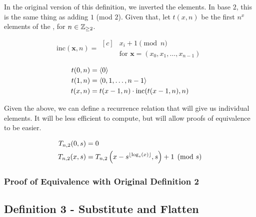 \documentclass[conference]{IEEEtran}
\begin{document}
In the original version of this definition, we inverted the elements. In base $2$, this is the same thing as adding $1$ (mod $2$). Given that, let $t(x, n)$ be the first $n^x$ elements of the \ETMS, for $n \in \mathbb{Z}_{\ge 2}$.

\begin{equation}
    \text{inc}(\mathbf{x}, n) = \begin{aligned}[c]
            &x_i + 1 \pmod{n} \\
            &\text{for } \mathbf{x} = (x_0, x_1, \ldots, x_{n-1})
    \end{aligned}
\end{equation}

\begin{equation}
    \begin{aligned}
t(0, n) &= \langle 0 \rangle \\
t(1, n) &= \langle 0, 1, \ldots, n - 1 \rangle \\
t(x, n) &= t(x - 1, n) \cdot \text{inc}(t(x - 1, n), n)
    \end{aligned}
\end{equation}

Given the above, we can define a recurrence relation that will give us individual elements. It will be less efficient to compute, but will allow proofs of equivalence to be easier.

\begin{equation}
    \begin{aligned}
T_{n,2}(0, s) &= 0 \\
T_{n,2}(x, s) &= T_{n,2}\left(x - s^{\left\lfloor \log_s(x) \right\rfloor}, s\right) + 1 \pmod{s}
    \end{aligned}
\end{equation}

\subsubsection{Proof of Equivalence with Original Definition 2}

\subsection{Definition 3 - Substitute and Flatten}

\end{document}
